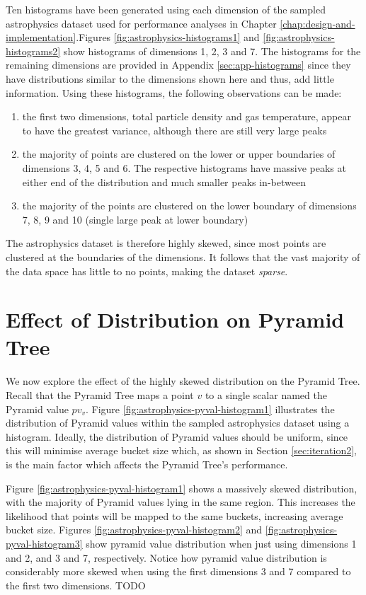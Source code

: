 Ten histograms have been generated using each dimension of the sampled astrophysics dataset used for performance analyses in Chapter \ref{chap:design-and-implementation}.Figures \ref{fig:astrophysics-histograms1} and \ref{fig:astrophysics-histograms2} show histograms of dimensions 1, 2, 3 and 7. The histograms for the remaining dimensions are provided in Appendix \ref{sec:app-histograms} since they have distributions similar to the dimensions shown here and thus, add little information. Using these histograms, the following observations can be made:
\begin{enumerate}
	\item the first two dimensions, total particle density and gas temperature, appear to have the greatest variance, although there are still very large peaks
	\item the majority of points are clustered on the lower or upper boundaries of dimensions 3, 4, 5 and 6. The respective histograms have massive peaks at either end of the distribution and much smaller peaks in-between
	\item the majority of the points are clustered on the lower boundary of dimensions 7, 8, 9 and 10 (single large peak at lower boundary)
\end{enumerate}
The astrophysics dataset is therefore highly skewed, since most points are clustered at the boundaries of the dimensions. It follows that the vast majority of the data space has little to no points, making the dataset \textit{sparse}.

\section{Effect of Distribution on Pyramid Tree}

We now explore the effect of the highly skewed distribution on the Pyramid Tree. Recall that the Pyramid Tree maps a point $v$ to a single scalar named the Pyramid value $pv_v$. Figure \ref{fig:astrophysics-pyval-histogram1} illustrates the distribution of Pyramid values within the sampled astrophysics dataset using a histogram. Ideally, the distribution of Pyramid values should be uniform, since this will minimise average bucket size which, as shown in Section \ref{sec:iteration2}, is the main factor which affects the Pyramid Tree's performance.

Figure \ref{fig:astrophysics-pyval-histogram1} shows a massively skewed distribution, with the majority of Pyramid values lying in the same region. This increases the likelihood that points will be mapped to the same buckets, increasing average bucket size. Figures \ref{fig:astrophysics-pyval-histogram2} and \ref{fig:astrophysics-pyval-histogram3} show pyramid value distribution when just using dimensions 1 and 2, and 3 and 7, respectively. Notice how pyramid value distribution is considerably more skewed when using the first dimensions 3 and 7 compared to the first two dimensions. TODO

